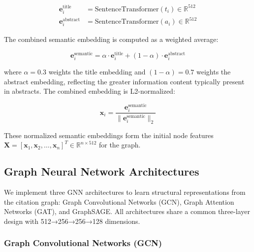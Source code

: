 \documentclass[pdflatex,sn-mathphys-num]{sn-jnl}
\theoremstyle{thmstyleone}%
\theoremstyle{thmstyletwo}%
\theoremstyle{thmstylethree}%
\begin{document}
\begin{align}
    \mathbf{e}_i^{\text{title}} &= \text{SentenceTransformer}(t_i) \in \mathbb{R}^{512} \\
    \mathbf{e}_i^{\text{abstract}} &= \text{SentenceTransformer}(a_i) \in \mathbb{R}^{512}
\end{align}

The combined semantic embedding is computed as a weighted average:

\begin{equation}
    \mathbf{e}_i^{\text{semantic}} = \alpha \cdot \mathbf{e}_i^{\text{title}} + (1-\alpha) \cdot \mathbf{e}_i^{\text{abstract}}
\end{equation}

where $\alpha = 0.3$ weights the title embedding and $(1-\alpha) = 0.7$ weights the abstract embedding, reflecting the greater information content typically present in abstracts. The combined embedding is L2-normalized:

\begin{equation}
    \mathbf{x}_i = \frac{\mathbf{e}_i^{\text{semantic}}}{\|\mathbf{e}_i^{\text{semantic}}\|_2}
\end{equation}

These normalized semantic embeddings form the initial node features $\mathbf{X} = [\mathbf{x}_1, \mathbf{x}_2, \ldots, \mathbf{x}_n]^T \in \mathbb{R}^{n \times 512}$ for the graph.

\subsection{Graph Neural Network Architectures}

%     

We implement three GNN architectures to learn structural representations from the citation graph: Graph Convolutional Networks (GCN), Graph Attention Networks (GAT), and GraphSAGE. All architectures share a common three-layer design with 512→256→256→128 dimensions.

\subsubsection{Graph Convolutional Networks (GCN)}
\end{document}
